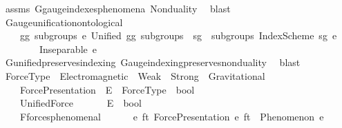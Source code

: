 \begin{isabellebody}
\endisadelimproof
%
\isatagproof
{}\isamarkupfalse%
\ assms\ G{}{\isacharunderscore}{\kern0pt}gauge{\isacharunderscore}{\kern0pt}indexes{\isacharunderscore}{\kern0pt}phenomena\ Nonduality\ \isamarkupfalse%
\ blast%
\endisatagproof
{\isafoldproof}%
%
\isadelimproof
\isanewline
%
\endisadelimproof
\isanewline
\ \ \isamarkupfalse%
\ Gauge{\isacharunderscore}{\kern0pt}unification{\isacharunderscore}{\kern0pt}ontological{\isacharcolon}{\kern0pt}\isanewline
\ \ \ \ {\isachardoublequoteopen}{\isasymforall}gg\ subgroups\ e{\isachardot}{\kern0pt}\ Unified\ gg\ subgroups\ {\isasymand}\ {\isacharparenleft}{\kern0pt}{\isasymexists}sg\ {\isasymin}\ subgroups{\isachardot}{\kern0pt}\ IndexScheme\ sg\ e{\isacharparenright}{\kern0pt}\isanewline
\ \ \ \ \ \ \ {\isasymlongrightarrow}\ Inseparable\ e\ {\isasymOmega}{\isachardoublequoteclose}\isanewline
%
\isadelimproof
\ \ \ \ %
\endisadelimproof
%
\isatagproof
{}\isamarkupfalse%
\ G{}{\isacharunderscore}{\kern0pt}unified{\isacharunderscore}{\kern0pt}preserves{\isacharunderscore}{\kern0pt}indexing\ Gauge{\isacharunderscore}{\kern0pt}indexing{\isacharunderscore}{\kern0pt}preserves{\isacharunderscore}{\kern0pt}nonduality\ \isamarkupfalse%
\ blast%
\endisatagproof
{\isafoldproof}%
%
\isadelimproof
%
\endisadelimproof
%
\isadelimdocument
%
\endisadelimdocument
%
\isatagdocument
%
\isamarkuptrue%
%
\endisatagdocument
{\isafolddocument}%
%
\isadelimdocument
%
\endisadelimdocument
\ \ \isamarkupfalse%
\ ForceType\ {\isacharequal}{\kern0pt}\ Electromagnetic\ {\isacharbar}{\kern0pt}\ Weak\ {\isacharbar}{\kern0pt}\ Strong\ {\isacharbar}{\kern0pt}\ Gravitational\isanewline
\isanewline
\ \ \isamarkupfalse%
\isanewline
\ \ \ \ ForcePresentation\ {\isacharcolon}{\kern0pt}{\isacharcolon}{\kern0pt}\ {\isachardoublequoteopen}E\ {\isasymRightarrow}\ ForceType\ {\isasymRightarrow}\ bool{\isachardoublequoteclose}\ \ \isanewline
\ \ \ \ UnifiedForce\ \ \ \ \ \ {\isacharcolon}{\kern0pt}{\isacharcolon}{\kern0pt}\ {\isachardoublequoteopen}E\ {\isasymRightarrow}\ bool{\isachardoublequoteclose}\ \ \ \ \ \ \ \ \ \ \ \ \ \ \ \ \ \ \ \ \isanewline
\isanewline
\ \ \isamarkupfalse%
\ \isanewline
\ \ \ \ F{}{\isacharunderscore}{\kern0pt}forces{\isacharunderscore}{\kern0pt}phenomenal{\isacharcolon}{\kern0pt}\isanewline
\ \ \ \ \ \ {\isachardoublequoteopen}{\isasymforall}e\ ft{\isachardot}{\kern0pt}\ ForcePresentation\ e\ ft\ {\isasymlongrightarrow}\ Phenomenon\ e{\isachardoublequoteclose}\ \isanewline

\end{isabellebody}

